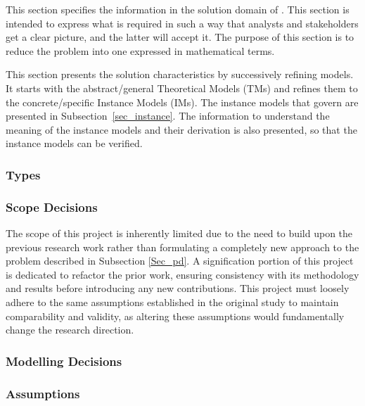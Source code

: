 \documentclass[12pt]{article}
\begin{document}
This section specifies the information in the solution domain of \progname. This
section is intended to express what is required in such a way that analysts and
stakeholders get a clear picture, and the latter will accept it. The purpose of
this section is to reduce the problem into one expressed in mathematical terms.

This section presents the solution characteristics by successively refining
models. It starts with the abstract/general Theoretical Models (TMs) and refines
them to the concrete/specific Instance Models (IMs). The instance models that
govern \progname are presented in Subsection~\ref{sec_instance}. The
information to understand the meaning of the instance models and their
derivation is also presented, so that the instance models can be verified.

\subsubsection{Types}


\subsubsection{Scope Decisions}

The scope of this project is inherently limited due to the need to build upon
the previous research work rather than formulating a completely new approach to
the problem described in Subsection \ref{Sec_pd}. A signification portion of this
project is dedicated to refactor the prior work, ensuring consistency with its
methodology and results before introducing any new contributions. This project
must loosely adhere to the same assumptions established in the original study to
maintain comparability and validity, as altering these assumptions would
fundamentally change the research direction.

\subsubsection{Modelling Decisions}


\subsubsection{Assumptions} \label{sec_assumpt}
\end{document}
